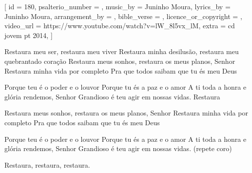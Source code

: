 [
    id                     = {180},
    psalterio_number       = {},
    music_by               = {Juninho Moura},
    lyrics_by              = {Juninho Moura},
    arrangement_by         = {},
    bible_verse            = {},
    licence_or_copyright   = {},
    video_url              = {https://www.youtube.com/watch?v=lW_8l5vx_lM},
    extra                  = {cd jovem pt 2014},
]

\beginverse
Restaura meu ser, restaura meu viver
Restaura minha desilusão, restaura meu quebrantado coração
Restaura meus sonhos, restaura os meus planos, Senhor
Restaura minha vida por completo
Pra que todos saibam que tu és meu Deus
\endverse

\beginchorus
Porque teu é o poder e o louvor
Porque tu és a paz e o amor
A ti toda a honra e glória rendemos, Senhor
Grandioso é teu agir em nossas vidas. Restaura
\endchorus


\beginverse
Restaura meus sonhos, restaura os meus planos, Senhor
Restaura minha vida por completo
Pra que todos saibam que tu és meu Deus
\endverse

\beginchorus
Porque teu é o poder e o louvor
Porque tu és a paz e o amor
A ti toda a honra e glória rendemos, Senhor
Grandioso é teu agir em nossas vidas. (repete coro)

Restaura, restaura, restaura.
\endchorus

\endsong
